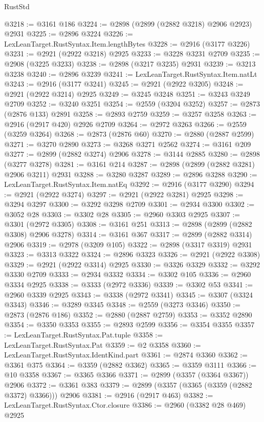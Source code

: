 \begin{lexlean}{RustStd}
\begin{coremodule}
@3218 := @3161 @186
@3224 := @2898 (@2899 (@2882 @3218) @2906 @2923) @2931
@3225 := @2896 @3224
@3226 := LexLeanTarget.RustSyntax.Item.lengthBytes
@3228 := @2916 (@3177 @3226)
@3231 := @2921 (@2922 @3218) @2925
@3233 := @3228 @3231 @2709
@3235 := @2908 (@3225 @3233)
@3238 := @2898 (@3217 @3235) @2931
@3239 := @3213 @3238
@3240 := @2896 @3239
@3241 := LexLeanTarget.RustSyntax.Item.natLt
@3243 := @2916 (@3177 @3241)
@3245 := @2921 (@2922 @3205)
@3248 := @2921 (@2922 @3214) @2925
@3249 := @3245 @3248
@3251 := @3243 @3249 @2709
@3252 := @3240 @3251
@3254 := @2559 (@3204 @3252)
@3257 := @2873 (@2876 @133) @2891
@3258 := @2893 @2759
@3259 := @3257 @3258
@3263 := @2916 (@2917 @420) @2926 @2709
@3264 := @2972 @3263
@3266 := @2559 (@3259 @3264)
@3268 := @2873 (@2876 @60)
@3270 := @2880 (@2887 @2599)
@3271 := @3270 @2890
@3273 := @3268 @3271 @2562
@3274 := @3161 @209
@3277 := @2899 (@2882 @3274) @2906
@3278 := @3144 @2885
@3280 := @2898 (@3277 @3278)
@3281 := @3161 @214
@3287 := @2898 (@2899 (@2882 @3281) @2906 @3211) @2931
@3288 := @3280 @3287
@3289 := @2896 @3288
@3290 := LexLeanTarget.RustSyntax.Item.natEq
@3292 := @2916 (@3177 @3290)
@3294 := @2921 (@2922 @3274)
@3297 := @2921 (@2922 @3281) @2925
@3298 := @3294 @3297
@3300 := @3292 @3298 @2709
@3301 := @2934 @3300
@3302 := @3052 @28
@3303 := @3302 @28
@3305 := @2960 @3303 @2925
@3307 := @3301 (@2972 @3305)
@3308 := @3161 @251
@3313 := @2898 (@2899 (@2882 @3308) @2906 @3278)
@3314 := @3161 @367
@3317 := @2899 (@2882 @3314) @2906
@3319 := @2978 (@3209 @105)
@3322 := @2898 (@3317 @3319) @2931
@3323 := @3313 @3322
@3324 := @2896 @3323
@3326 := @2921 (@2922 @3308)
@3329 := @2921 (@2922 @3314) @2925
@3330 := @3326 @3329
@3332 := @3292 @3330 @2709
@3333 := @2934 @3332
@3334 := @3302 @105
@3336 := @2960 @3334 @2925
@3338 := @3333 (@2972 @3336)
@3339 := @3302 @53
@3341 := @2960 @3339 @2925
@3343 := @3338 (@2972 @3341)
@3345 := @3307 (@3324 @3343)
@3346 := @3289 @3345
@3348 := @2559 (@3273 @3346)
@3350 := @2873 (@2876 @186)
@3352 := @2880 (@2887 @2759)
@3353 := @3352 @2890
@3354 := @3350 @3353
@3355 := @2893 @2599
@3356 := @3354 @3355
@3357 := LexLeanTarget.RustSyntax.Pat.tuple
@3358 := LexLeanTarget.RustSyntax.Pat
@3359 := @2 @3358
@3360 := LexLeanTarget.RustSyntax.IdentKind.part
@3361 := @2874 @3360
@3362 := @3361 @375
@3364 := @3359 (@2882 @3362)
@3365 := @3359 @3111
@3366 := @10 @3358
@3367 := @3365 @3366
@3371 := @2899 (@3357 (@3364 @3367)) @2906
@3372 := @3361 @383
@3379 := @2899 (@3357 (@3365 (@3359 (@2882 @3372) @3366))) @2906
@3381 := @2916 (@2917 @463)
@3382 := LexLeanTarget.RustSyntax.Ctor.closure
@3386 := @2960 (@3382 @28 @469) @2925

\end{coremodule}
\end{lexlean}
